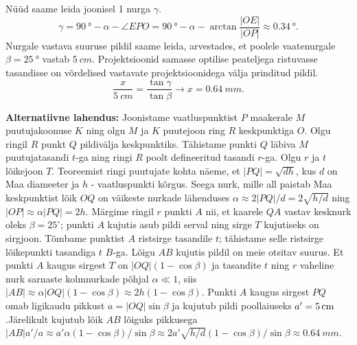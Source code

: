 \documentclass[10pt]{article}
\begin{document}
Nüüd saame leida joonisel 1 nurga $\gamma$.
$$\gamma = \SI{90}{\degree}-\alpha-\angle EPO = \SI{90}{\degree}-\alpha-\arctan{\frac{|OE|}{|OP|}}\approx \SI{0.34}{\degree}.$$
Nurgale vastava suuruse pildil saame leida, arvestades, et poolele vaatenurgale $\beta=\SI{25}{\degree}$ vastab $\SI{5}{cm}$. Projektsioonid samasse optilise peateljega ristuvasse tasandisse on võrdelised vastavate projektsioonidega välja prinditud pildil. $$\frac{x}{\SI{5}{cm}}=\frac{\tan{\gamma}}{\tan{\beta}} \rightarrow x = \SI{0.64}{mm}.$$

{\bf Alternatiivne lahendus:} Joonistame vaatluspunktist $P$ maakerale $M$ puutujakoonuse $K$ ning olgu $M$ ja $K$ puutejoon ring $R$ keskpunktiga $O$. Olgu ringil $R$ punkt $Q$ pildivälja keskpunktiks. Tähistame punkti $Q$ läbiva $M$ puutujatasandi $t$-ga ning ringi $R$ poolt defineeritud tasandi $r$-ga. Olgu $r$ ja $t$ lõikejoon $T$. Teoreemist ringi puutujate kohta näeme, et $|PQ|=\sqrt{dh}$, kus $d$ on Maa diameeter ja $h$ - vaatluspunkti kõrgus. Seega nurk, mille all paistab Maa keskpunktist lõik $OQ$ on väikeste nurkade lähenduses $\alpha \approx 2|PQ|/d=2\sqrt{h/d}$ ning $|OP|\approx \alpha |PQ|=2h$. Märgime ringil $r$ punkti $A$ nii, et kaarele $QA$ vastav kesknurk oleks $\beta=25^\circ$; punkti $A$ kujutis asub pildi serval ning sirge $T$ kujutiseks on sirgjoon. Tõmbame punktist $A$ ristsirge tasandile $t$; tähistame selle ristsirge lõikepunkti tasandiga $t$ $B$-ga. Lõigu $AB$ kujutis pildil on meie otsitav suurus. Et punkti $A$ kaugus sirgest $T$ on $|OQ|(1-\cos\beta)$ ja tasandite $t$ ning $r$ vaheline nurk sarnaste kolmnurkade põhjal $\alpha \ll 1$, siis $|AB|\approx \alpha |OQ|(1-\cos\beta)\approx 2h(1-\cos\beta)$. Punkti $A$ kaugus sirgest $PQ$ omab ligikaudu pikkust $a=|OQ|\sin\beta$ ja kujutub pildi poollaiuseks $a'=\SI 5{cm}$.Järelikult kujutub lõik $AB$ lõiguks pikkusega $|AB|a'/a\approx a'\alpha(1-\cos\beta)/\sin\beta\approx 2a'\sqrt{h/d}(1-\cos\beta)/\sin\beta\approx \SI{0.64}{mm}$.
\probend
\bigskip

\setAuthor{}
\end{document}
